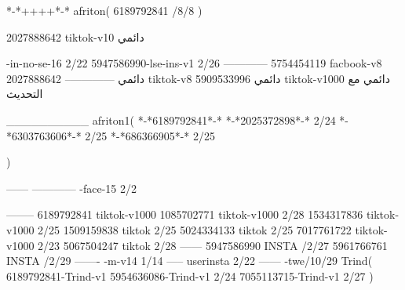 *-*++++*-*
afriton(
6189792841 /8/8
)

2027888642 tiktok-v10
دائمي

-in-no-se-16 2/22
5947586990-lse-ins-v1 2/26
------------
5754454119 facbook-v8
دائمي
--------------
2027888642 tiktok-v8
دائمي
5909533996 tiktok-v1000
دائمي مع التحديث

__________
afriton1(
*-*6189792841*-*
*-*2025372898*-* 2/24
*-*6303763606*-* 2/25
*-*686366905*-* 2/25

)


------
------------
-face-15 2/2

--------
6189792841 tiktok-v1000
1085702771 tiktok-v1000 2/28
1534317836 tiktok-v1000 2/25
1509159838 tiktok 2/25
5024334133 tiktok 2/25
7017761722 tiktok-v1000 2/23
5067504247 tiktok 2/28
------
5947586990 INSTA /2/27
5961766761 INSTA /2/29
-------
-m-v14 1/14
-----
userinsta 2/22
------
-twe/10/29
Trind(
6189792841-Trind-v1 
5954636086-Trind-v1 2/24
7055113715-Trind-v1 2/27
)

